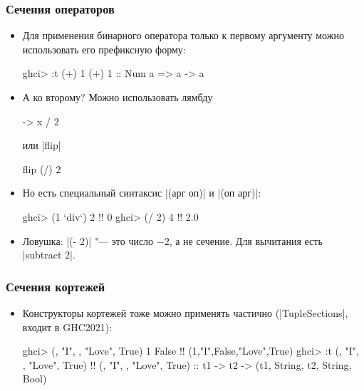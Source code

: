 \documentclass[10pt]{beamer}
\begin{document}
\begin{frame}[fragile]
  \frametitle{Сечения операторов}
  \begin{itemize}
    \item Для применения бинарного оператора только к первому аргументу можно использовать его префиксную форму:
          \begin{haskell}
            ghci> :t (+) 1
            (+) 1 :: Num a => a -> a
          \end{haskell}
          \pause
    \item А ко второму? Можно использовать лямбду
          \begin{haskell}
            \x -> x / 2
          \end{haskell}
          или \haskinline|flip|
          \begin{haskell}
            flip (/) 2
          \end{haskell}
          \pause
    \item Но есть специальный синтаксис \haskinline|(арг оп)| и \haskinline|(оп арг)|:
          \begin{haskell}
            ghci> (1 `div`) 2 !\pause!
            0
            ghci> (/ 2) 4 !\pause!
            2.0
          \end{haskell}
          \pause
    \item Ловушка: \haskinline|(- 2)| "--- это число $-2$, а не сечение. Для вычитания есть \haskinline|subtract 2|.
  \end{itemize}
\end{frame}

\begin{frame}[fragile]
  \frametitle{Сечения кортежей}
  \begin{itemize}
    \item Конструкторы кортежей тоже можно применять частично (\haskinline|TupleSections|, входит в GHC2021):
          \begin{haskell}
            ghci> (, "I", , "Love", True) 1 False !\pause!
            (1,"I",False,"Love",True)
            ghci> :t (, "I", , "Love", True) !\pause!
            (, "I", , "Love", True)
              :: t1 -> t2 -> (t1, String, t2, String, Bool)
          \end{haskell}
  \end{itemize}
\end{frame}
\end{document}
